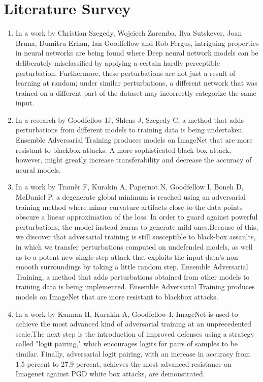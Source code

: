 \documentclass[ 12pt,a4paper,twocolumn,fleqn]{article}
\begin{document}
\section{Literature Survey}
\begin{enumerate}
    \item In a work by Christian Szegedy, Wojciech Zaremba, Ilya Sutskever, Joan Bruna, Dumitru Erhan, Ian Goodfellow and Rob Fergus, intriguing properties in neural networks are being found where Deep neural network models can be deliberately misclassified by applying a certain hardly perceptible perturbation. Furthermore, these perturbations are not just a result of learning at random; under similar perturbations, a different network that was trained on a different part of the dataset may incorrectly categorize the same input.
    \item In a research by Goodfellow IJ, Shlens J, Szegedy C, a method that adds perturbations from different models to training data is being undertaken. Ensemble Adversarial Training produces models on ImageNet that are more resistant to blackbox attacks. A more sophisticated black-box attack, however, might greatly increase transferability and decrease the accuracy of neural models.
    \item In a work by Tramèr F, Kurakin A, Papernot N, Goodfellow I, Boneh D, McDaniel P, a degenerate global minimum is reached using an adversarial training method where minor curvature artifacts close to the data points obscure a linear approximation of the loss. In order to guard against powerful perturbations, the model instead learns to generate mild ones.Because of this, we discover that adversarial training is still susceptible to black-box assaults, in which we transfer perturbations computed on undefended models, as well as to a potent new single-step attack that exploits the input data's non-smooth surroundings by taking a little random step. Ensemble Adversarial Training, a method that adds perturbations obtained from other models to training data is being implemented. Ensemble Adversarial Training produces models on ImageNet that are more resistant to blackbox attacks.
    \item In a work by Kannan H, Kurakin A, Goodfellow I, ImageNet is used  to achieve the most advanced kind of adversarial training at an unprecedented scale.The next step is the introduction of improved defenses using a strategy called "logit pairing," which encourages logits for pairs of samples to be similar. Finally, adversarial logit pairing, with an increase in accuracy from 1.5 percent to 27.9 percent, achieves the most advanced resistance on Imagenet against PGD white box attacks, are demonstrated.

\end{enumerate}
\end{document}
